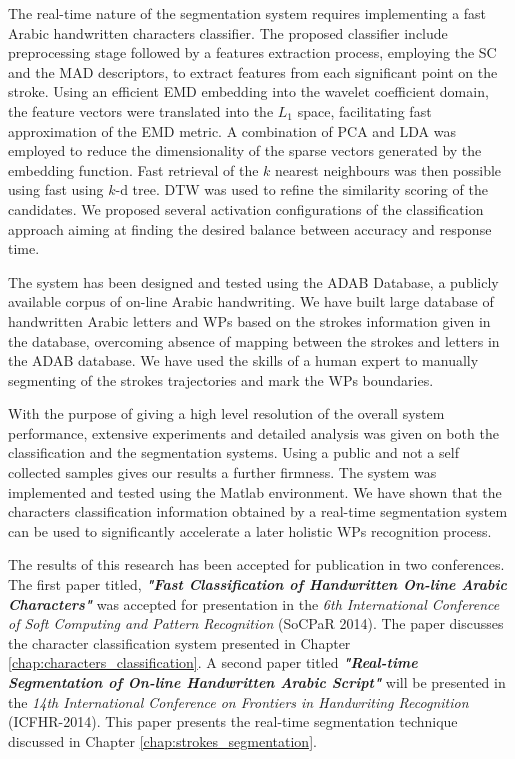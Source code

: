 The real-time nature of the segmentation system requires implementing a fast Arabic handwritten characters classifier.
The proposed classifier include preprocessing stage followed by a features extraction process, employing the SC and the MAD descriptors, to extract features from each significant point on the stroke.
Using an efficient EMD embedding into the wavelet coefficient domain, the feature vectors were translated into the $L_1$ space, facilitating fast approximation of the EMD metric.
A combination of PCA and LDA was employed to reduce the dimensionality of the sparse vectors generated by the embedding function.
Fast retrieval of the $k$ nearest neighbours was then possible using fast using $k$-d tree.
DTW was used to refine the similarity scoring of the candidates.
We proposed several activation configurations of the classification approach aiming at finding the desired balance between accuracy and response time.

The system has been designed and tested using the ADAB Database, a publicly available corpus of on-line Arabic handwriting.
We have built large database of handwritten Arabic letters and WPs based on the strokes information given in the database, overcoming absence of mapping between the strokes and letters in the ADAB database.
We have used the skills of a human expert to manually segmenting of the strokes trajectories and mark the WPs boundaries.

With the purpose of giving a high level resolution of the overall system performance, extensive experiments and detailed analysis was given on both the classification and the segmentation systems.
Using a public and not a self collected samples gives our results a further firmness.
The system was implemented and tested using the Matlab environment.
We have shown that the characters classification information obtained by a real-time segmentation system can be used to significantly accelerate a later holistic WPs recognition process.

The results of this research has been accepted for publication in two conferences.
The first paper titled, \textbf{\emph{"Fast Classification of Handwritten On-line Arabic Characters"}} was accepted for presentation in the \emph{6th International Conference of Soft Computing and Pattern Recognition} (SoCPaR 2014).
The paper discusses the character classification system presented in Chapter \ref{chap:characters_classification}.
A second paper titled \textbf{\emph{"Real-time Segmentation of On-line Handwritten Arabic Script"}} will be presented in the \emph{14th International Conference on Frontiers in Handwriting Recognition} (ICFHR-2014).
This paper presents the real-time segmentation technique discussed in Chapter \ref{chap:strokes_segmentation}.


